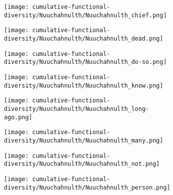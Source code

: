 \begin{figure}

  \caption{Cumulative functional diversity of high-frequency lexical items in Nuuchahnulth}
  \label{fig:cumulative-functional-diversity-Nuuchahnulth-items}
  \centering

  \begin{subfigure}{0.5\linewidth}
    \centering
    \caption{ }
    \texttt{[image: cumulative-functional-diversity/Nuuchahnulth/Nuuchahnulth\_chief.png]}
  \end{subfigure}%
  \begin{subfigure}{0.5\linewidth}
    \centering
    \caption{ }
    \texttt{[image: cumulative-functional-diversity/Nuuchahnulth/Nuuchahnulth\_dead.png]}
  \end{subfigure}

  \begin{subfigure}{0.5\linewidth}
    \centering
    \caption{ }
    \texttt{[image: cumulative-functional-diversity/Nuuchahnulth/Nuuchahnulth\_do-so.png]}
  \end{subfigure}%
  \begin{subfigure}{0.5\linewidth}
    \centering
    \caption{ }
    \texttt{[image: cumulative-functional-diversity/Nuuchahnulth/Nuuchahnulth\_know.png]}
  \end{subfigure}

  \begin{subfigure}{0.5\linewidth}
    \centering
    \caption{ }
    \texttt{[image: cumulative-functional-diversity/Nuuchahnulth/Nuuchahnulth\_long-ago.png]}
  \end{subfigure}%
  \begin{subfigure}{0.5\linewidth}
    \centering
    \caption{ }
    \texttt{[image: cumulative-functional-diversity/Nuuchahnulth/Nuuchahnulth\_many.png]}
  \end{subfigure}

  \begin{subfigure}{0.5\linewidth}
    \centering
    \caption{ }
    \texttt{[image: cumulative-functional-diversity/Nuuchahnulth/Nuuchahnulth\_not.png]}
  \end{subfigure}%
  \begin{subfigure}{0.5\linewidth}
    \centering
    \caption{ }
    \texttt{[image: cumulative-functional-diversity/Nuuchahnulth/Nuuchahnulth\_person.png]}
  \end{subfigure}


\end{figure}
